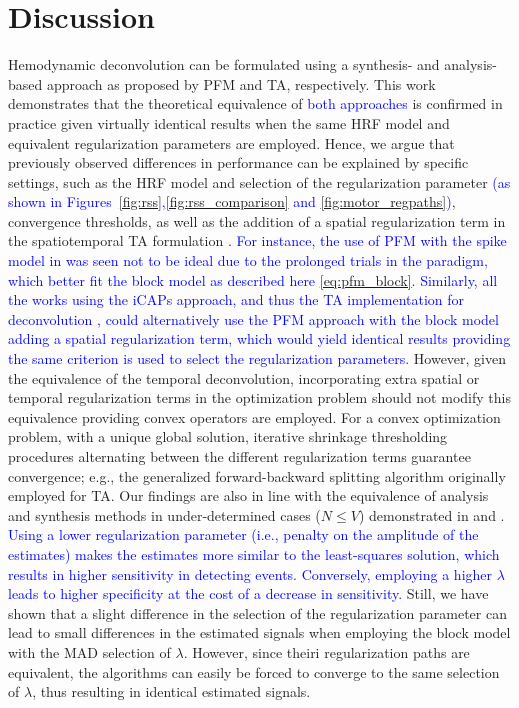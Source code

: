 
\section{Discussion}

Hemodynamic deconvolution can be formulated using a synthesis- and
analysis-based approach as proposed by PFM and TA, respectively. This work
demonstrates that the theoretical equivalence of \textcolor{blue}{both
approaches} is confirmed in practice given virtually identical results when the
same HRF model and equivalent regularization parameters are employed. Hence, we
argue that previously observed differences in performance can be explained by
specific settings, such as the HRF model and selection of the regularization
parameter \textcolor{blue}{(as shown in
Figures~\ref{fig:rss},\ref{fig:rss_comparison} and \ref{fig:motor_regpaths})},
convergence thresholds, as well as the addition of a spatial regularization term
in the spatiotemporal TA formulation \citep{Karahanoglu2013TotalactivationfMRI}.
\textcolor{blue}{For instance, the use of PFM with the spike model in
\citep{Tan_2017} was seen not to be ideal due to the prolonged trials in the
paradigm, which better fit the block model as described here
\eqref{eq:pfm_block}. Similarly, all the works using the iCAPs approach, and
thus the TA implementation for deconvolution
\citep{Kinany2020DynamicFunctionalConnectivity,Zoeller2019Largescalebrain,
Pirondini2022Poststrokereorganization}, could alternatively use the PFM approach
with the block model adding a spatial regularization term, which would yield
identical results providing the same criterion is used to select the
regularization parameters.} However, given the equivalence of the temporal
deconvolution, incorporating extra spatial or temporal regularization terms in
the optimization problem should not modify this equivalence providing convex
operators are employed. For a convex optimization problem, with a unique global
solution, iterative shrinkage thresholding procedures alternating between the
different regularization terms guarantee convergence; e.g., the generalized
forward-backward splitting \citep{Raguet2013GeneralizedForwardBackward}
algorithm originally employed for TA. Our findings are also in line with the
equivalence of analysis and synthesis methods in under-determined cases (\(N
\leq V\)) demonstrated in \citep{Elad2007Analysisversussynthesis} and
\citep{ortelli2019synthesis}. \textcolor{blue}{Using a lower regularization
parameter (i.e., penalty on the amplitude of the estimates) makes the estimates
more similar to the least-squares solution, which results in higher sensitivity
in detecting events. Conversely, employing a higher $\lambda$ leads to higher
specificity at the cost of a decrease in sensitivity.} Still, we have shown that
a slight difference in the selection of the regularization parameter can lead to
small differences in the estimated signals when employing the block model with
the MAD selection of $\lambda$. However, since theiri regularization paths are
equivalent, the algorithms can easily be forced to converge to the same
selection of $\lambda$, thus resulting in identical estimated signals.

